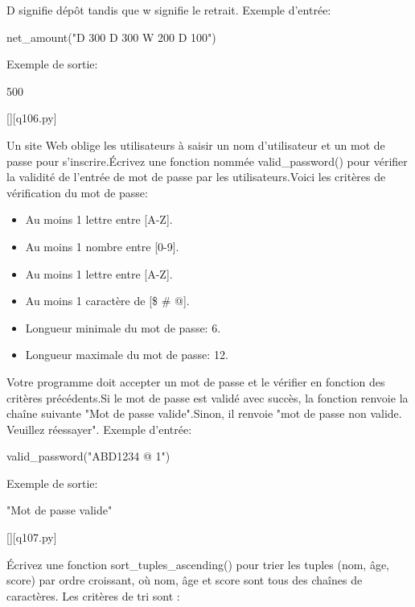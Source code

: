 		D signifie dépôt tandis que w signifie le retrait.\newline
		Exemple d'entrée:
		
		net\_amount("D 300 D 300 W 200 D 100")
		
		Exemple de sortie:
		
		500
		\par
		\renewcommand{\nomfichier}{q106.py}
		\begin{solution}
		    \pythonfile{\chemincode \nomfichier}[][\nomfichier]
		\end{solution}
        
		\question
		Un site Web oblige les utilisateurs à saisir un nom d'utilisateur et un mot de passe pour s'inscrire.Écrivez une fonction nommée valid\_password() pour vérifier la validité de l'entrée de mot de passe par les utilisateurs.Voici les critères de vérification du mot de passe:
		
	\begin{itemize}
	\item 	Au moins 1 lettre entre [A-Z].
	\item 		Au moins 1 nombre entre [0-9].
	\item 		Au moins 1 lettre entre [A-Z].
	\item 		Au moins 1 caractère de [\$ \# @].
	\item 		Longueur minimale du mot de passe: 6.
	\item 		Longueur maximale du mot de passe: 12.
	\end{itemize}
		
		Votre programme doit accepter un mot de passe et le vérifier en fonction des critères précédents.Si le mot de passe est validé avec succès, la fonction renvoie la chaîne suivante "Mot de passe valide".Sinon, il renvoie "mot de passe non valide. Veuillez réessayer".
		Exemple d'entrée:
		
		valid\_password("ABD1234 @ 1")
		
		Exemple de sortie:
		
		"Mot de passe valide"
		\par
		\renewcommand{\nomfichier}{q107.py}
		\begin{solution}
		    \pythonfile{\chemincode \nomfichier}[][\nomfichier]
		\end{solution}
        
		\question
		Écrivez une fonction sort\_tuples\_ascending() pour trier les tuples (nom, âge, score) par ordre croissant, où nom, âge et score sont tous des chaînes de caractères. Les critères de tri sont :
		
